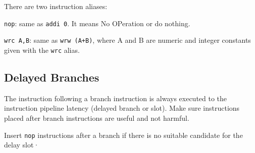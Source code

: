 There are two instruction aliases:
\begin{description}
\item {\tt nop}: same as  {\tt addi 0}. It means No OPeration or do nothing.
\item {\tt wrc A,B}: same as {\tt wrw (A+B)}, where A and B are numeric and
  integer constants given with the {\tt wrc} alias.
\end{description}

\subsection{Delayed Branches}

The instruction following a branch instruction is always executed to the
instruction pipeline latency (delayed branch or slot). Make sure instructions
placed after branch instructions are useful and not harmful.

Insert {\tt nop} instructions after a branch if there is no suitable candidate
for the delay slot·

